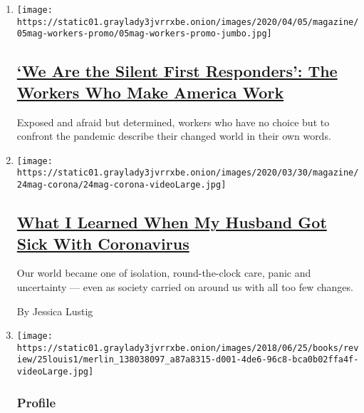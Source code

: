 \begin{enumerate}
\def\labelenumi{\arabic{enumi}.}
\item
  \texttt{[image: https://static01.graylady3jvrrxbe.onion/images/2020/04/05/magazine/05mag-workers-promo/05mag-workers-promo-jumbo.jpg]}

  \hypertarget{we-are-the-silent-first-responders-the-workers-who-make-america-work}{%
  \subsection{\texorpdfstring{\href{/interactive/2020/04/01/magazine/coronavirus-workers.html}{`We
  Are the Silent First Responders': The Workers Who Make America
  Work}}{`We Are the Silent First Responders': The Workers Who Make America Work}}\label{we-are-the-silent-first-responders-the-workers-who-make-america-work}}

  Exposed and afraid but determined, workers who have no choice but to
  confront the pandemic describe their changed world in their own words.
\item
  \texttt{[image: https://static01.graylady3jvrrxbe.onion/images/2020/03/30/magazine/24mag-corona/24mag-corona-videoLarge.jpg]}

  \hypertarget{what-i-learned-when-my-husband-got-sick-with-coronavirus}{%
  \subsection{\texorpdfstring{\href{/2020/03/24/magazine/coronavirus-family.html}{What
  I Learned When My Husband Got Sick With
  Coronavirus}}{What I Learned When My Husband Got Sick With Coronavirus}}\label{what-i-learned-when-my-husband-got-sick-with-coronavirus}}

  Our world became one of isolation, round-the-clock care, panic and
  uncertainty --- even as society carried on around us with all too few
  changes.

  By Jessica Lustig
\item
  \texttt{[image: https://static01.graylady3jvrrxbe.onion/images/2018/06/25/books/review/25louis1/merlin\_138038097\_a87a8315-d001-4de6-96c8-bca0b02ffa4f-videoLarge.jpg]}

  \hypertarget{profile}{%
  \subsubsection{Profile}\label{profile}}

  \hypertarget{for-the-french-author-uxe9douard-louis-his-books-are-his-weapon}{%
}
\end{enumerate}
